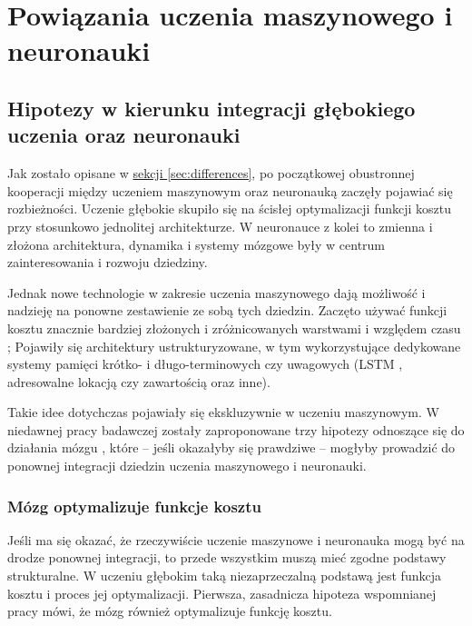 \chapter{Powiązania uczenia maszynowego i neuronauki}

\section{Hipotezy w kierunku integracji głębokiego uczenia oraz neuronauki}

Jak zostało opisane w \hyperref[sec:differences]{sekcji \ref*{sec:differences}}, po początkowej obustronnej kooperacji między uczeniem maszynowym oraz neuronauką zaczęły pojawiać się rozbieżności.
Uczenie głębokie skupiło się na ścisłej optymalizacji funkcji kosztu przy stosunkowo jednolitej architekturze.
W neuronauce z kolei to zmienna i złożona architektura, dynamika i systemy mózgowe były w centrum zainteresowania i rozwoju dziedziny.

Jednak nowe technologie w zakresie uczenia maszynowego dają możliwość i nadzieję na ponowne zestawienie ze sobą tych dziedzin.
Zaczęto używać funkcji kosztu znacznie bardziej złożonych i zróżnicowanych warstwami i względem czasu \cite{gulccehre2016knowledge, saxe2013exact};
Pojawiły się architektury ustrukturyzowane, w tym wykorzystujące dedykowane systemy pamięci krótko- i długo-terminowych czy uwagowych (LSTM \cite{chung2014empirical}, adresowalne lokacją czy zawartością \cite{graves2014neural} oraz inne).

Takie idee dotychczas pojawiały się ekskluzywnie w uczeniu maszynowym.
W niedawnej pracy badawczej zostały zaproponowane trzy hipotezy odnoszące się do działania mózgu \cite{marblestone2016toward}, które -- jeśli okazałyby się prawdziwe -- mogłyby prowadzić do ponownej integracji dziedzin uczenia maszynowego i neuronauki.

\subsection{Mózg optymalizuje funkcje kosztu}

Jeśli ma się okazać, że rzeczywiście uczenie maszynowe i neuronauka mogą być na drodze ponownej integracji, to przede wszystkim muszą mieć zgodne podstawy strukturalne.
W uczeniu głębokim taką niezaprzeczalną podstawą jest funkcja kosztu i proces jej optymalizacji.
Pierwsza, zasadnicza hipoteza wspomnianej pracy \cite{marblestone2016toward} mówi, że mózg również optymalizuje funkcję kosztu.

